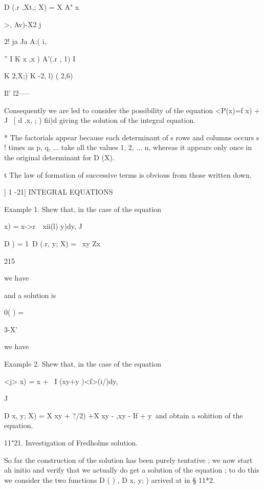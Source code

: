 D (.r ,Xt,; X) = X A" x



>, Av)-X2 j

2! ja Ja A:( i,



'' I K x ,x ) A'(.r , 1) I



K 2,X;) K -2, l) ( 2,6)



 Il' l2-----



Consequently we are led to consider the possibility of the equation
<P(x)=f x) + J \ [ d .x, ; ) fii)d giving the solution of the integral
equation.

* The factorials appear because each determinant of s rows and columns
occurs s ! times as p, q, ... take all the values 1, 2, ... n, whereas
it appears only once in the original determinant for D (X).

t The law of formation of successive terms is obvious from those
written down.



] 1 -21] INTEGRAL EQUATIONS

Example 1. Shew that, in the case of the equation

  x) = x->r\ \ xii(l) y)dy, J

D ) = 1\, D (.r, y; X) = \ xy Zx



215



we have

and a solution is



0( ) =



3-X'



we have



Example 2. Shew that, in the case of the equation

<j> x) = x + \ I (xy+y )<f>(i/)dy,

J

D x, y; X) = X xy + ?/2) +X xy - ,xy - If + y\ and obtain a sohition
of the equation.

11"21. Investigation of Fredholms solution.

So far the construction of the solution has been purely tentative ; we
now start ah initio and verify that we actually do get a solution of
the equation ; to do this we consider the two functions D ( ) , D x,
y; ) arrived at in § 11*2.

